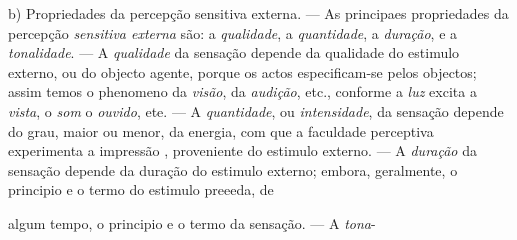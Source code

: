 b) Propriedades da percepção sensitiva externa. --- As principaes propriedades da percepção \emph{sensitiva externa} são: a \emph{qualidade}, a \emph{quantidade}, a \emph{duração}, e a \emph{tonalidade}. --- A \emph{qualidade} da   sensação depende da qualidade do estimulo externo, ou do objecto agente, porque os actos especificam-se pelos objectos; assim temos o phenomeno da \emph{visão}, da \emph{audição}, etc., conforme   a \emph{luz} excita a \emph{vista}, o \emph{som} o \emph{ouvido}, ete. --- A \emph{quantidade}, ou \emph{intensidade}, da sensação depende do grau, maior ou menor, da energia, com que a faculdade perceptiva experimenta a impressão  , proveniente do estimulo externo. --- A \emph{duração} da sensação depende da duração do estimulo externo; embora, geralmente, o principio e o termo do estimulo preeeda, de

algum tempo, o principio e o termo da sensação. --- A \emph{tona}-

